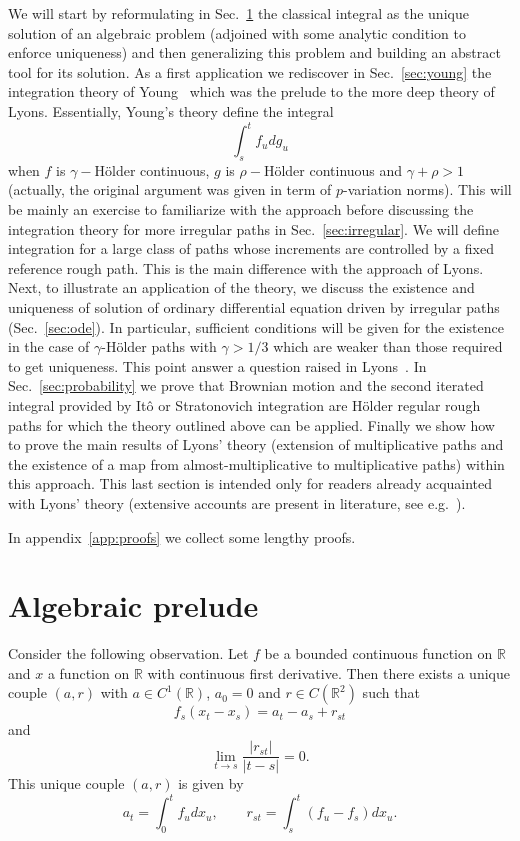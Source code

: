 \documentclass[a4paper,12pt,reqno]{amsproc}
\newcommand{\RR}{\mathbb{R}}
\begin{document}
We will start by reformulating in Sec.~\ref{sec:algebraic_prelude} the classical integral as the unique
solution of an algebraic problem (adjoined with some analytic
condition to enforce uniqueness) and then generalizing this problem
and building an abstract  tool for its solution.
As a first application we rediscover in Sec.~\ref{sec:young} the integration theory of Young~\cite{young} which was the prelude to
the more deep theory of Lyons. Essentially, Young's theory define the integral
$$
\int_s^t f_u dg_u
$$
when $f$ is $\gamma-$H\"older continuous, $g$ is $\rho-$H\"older
continuous and $\gamma+\rho > 1$ (actually, the original argument was given in term of
$p$-variation norms).
This will be mainly an
exercise to familiarize with the approach before discussing the
integration theory for more irregular paths in
Sec.~\ref{sec:irregular}. We will define integration for a large class
of paths whose increments are controlled by a fixed reference rough
path. This is the main difference with the approach of Lyons.
Next, to illustrate an application of the theory, we discuss  the existence and
uniqueness of solution of ordinary differential equation
driven by irregular paths (Sec.~\ref{sec:ode}). In particular,
sufficient conditions will be given for the existence in the case of
$\gamma$-H\"older paths with $\gamma > 1/3$ which are weaker than
those required to get uniqueness. This point answer a question raised
in Lyons~\cite{Lyons}. In Sec.~\ref{sec:probability} we prove that
Brownian motion and the second iterated integral provided by It\^o or
Stratonovich integration are H\"older regular rough paths for which
the theory outlined above can be applied.
Finally we show how to prove the main results of Lyons' theory
(extension of multiplicative paths and the existence of a map from
almost-multiplicative to multiplicative paths) within this
approach. This last section is intended only for readers already
acquainted with Lyons' theory (extensive accounts are present in literature, see e.g.~\cite{Lyons,lyonsbook}). 

In
appendix~\ref{app:proofs} we collect some lengthy proofs.
 




\section{Algebraic prelude}
\label{sec:algebraic_prelude}
Consider the following observation. Let $f$ be a bounded continuous
function on $\RR$ and $x$ a function on $\RR$ with continuous first
derivative. Then there exists a unique couple $(a,r)$ with $a \in
C^1(\RR)$, $a_0 = 0$ and $r \in C(\RR^2)$ such that
\begin{equation}
\label{eq:problem}
  f_s(x_t-x_s) = a_t-a_s + r_{st}
\end{equation}
and
\begin{equation}
\label{eq:condition}
  \lim_{t\to s} \frac{|r_{st}|}{|t-s|} = 0.
\end{equation}
This unique couple $(a,r)$ is given by 
$$
a_t = \int_0^t f_u dx_u, \qquad r_{st} = \int_s^t (f_u-f_s) dx_u.
$$ 
\end{document}
